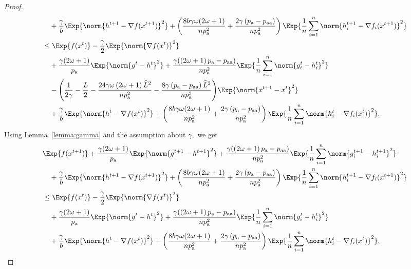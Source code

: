 \documentclass{article}
\newcommand*{\probavailable}{\ensuremath{p_{\textnormal{a}}}}
\newcommand*{\probpairaa}{\ensuremath{p_{\textnormal{aa}}}}
\begin{document}
\begin{proof}
\begin{align*}
      &\quad  + \frac{\gamma}{b} \Exp{\norm{h^{t+1} - \nabla f(x^{t+1})}^2} + \left(\frac{8 b \gamma \omega (2 \omega + 1)}{n \probavailable^2} + \frac{2 \gamma \left(\probavailable - \probpairaa\right)}{n \probavailable^2}\right) \Exp{\frac{1}{n}\sum_{i=1}^n\norm{h^{t+1}_i - \nabla f_i(x^{t+1})}^2}\\
      &\leq \Exp{f(x^t)} - \frac{\gamma}{2}\Exp{\norm{\nabla f(x^t)}^2} \\
      &\quad + \frac{\gamma (2 \omega + 1)}{\probavailable} \Exp{\norm{g^{t} - h^{t}}^2} + \frac{\gamma (\left(2 \omega + 1\right)\probavailable - \probpairaa)}{n \probavailable^2} \Exp{\frac{1}{n}\sum_{i=1}^n\norm{g^{t}_i - h^{t}_i}^2} \\
      &\quad - \Bigg(\frac{1}{2\gamma} - \frac{L}{2} - \frac{24 \gamma \omega \left(2 \omega + 1\right) \widehat{L}^2}{n \probavailable^2} - \frac{8\gamma \left(\probavailable - \probpairaa\right)\widehat{L}^2}{n \probavailable^3} \Bigg) \Exp{\norm{x^{t+1} - x^t}^2} \\
      &\quad + \frac{\gamma}{b} \Exp{\norm{h^{t} - \nabla f(x^{t})}^2} + \left(\frac{8 b \gamma \omega (2 \omega + 1)}{n \probavailable^2} + \frac{2 \gamma \left(\probavailable - \probpairaa\right)}{n \probavailable^2}\right)\Exp{\frac{1}{n}\sum_{i=1}^n\norm{h^{t}_i - \nabla f_i(x^{t})}^2}.
    \end{align*}
    Using Lemma~\ref{lemma:gamma} and the assumption about $\gamma,$ we get
    \begin{align*}
      &\Exp{f(x^{t + 1})} + \frac{\gamma (2 \omega + 1)}{\probavailable} \Exp{\norm{g^{t+1} - h^{t+1}}^2} + \frac{\gamma (\left(2 \omega + 1\right)\probavailable - \probpairaa)}{n \probavailable^2} \Exp{\frac{1}{n}\sum_{i=1}^n\norm{g^{t+1}_i - h^{t+1}_i}^2}\\
      &\quad  + \frac{\gamma}{b} \Exp{\norm{h^{t+1} - \nabla f(x^{t+1})}^2} + \left(\frac{8 b \gamma \omega (2 \omega + 1)}{n \probavailable^2} + \frac{2 \gamma \left(\probavailable - \probpairaa\right)}{n \probavailable^2}\right) \Exp{\frac{1}{n}\sum_{i=1}^n\norm{h^{t+1}_i - \nabla f_i(x^{t+1})}^2}\\
      &\leq \Exp{f(x^t)} - \frac{\gamma}{2}\Exp{\norm{\nabla f(x^t)}^2} \\
      &\quad + \frac{\gamma (2 \omega + 1)}{\probavailable} \Exp{\norm{g^{t} - h^{t}}^2} + \frac{\gamma (\left(2 \omega + 1\right)\probavailable - \probpairaa)}{n \probavailable^2} \Exp{\frac{1}{n}\sum_{i=1}^n\norm{g^{t}_i - h^{t}_i}^2} \\
      &\quad + \frac{\gamma}{b} \Exp{\norm{h^{t} - \nabla f(x^{t})}^2} + \left(\frac{8 b \gamma \omega (2 \omega + 1)}{n \probavailable^2} + \frac{2 \gamma \left(\probavailable - \probpairaa\right)}{n \probavailable^2}\right)\Exp{\frac{1}{n}\sum_{i=1}^n\norm{h^{t}_i - \nabla f_i(x^{t})}^2}.

\end{align*}
\end{proof}
\end{document}
